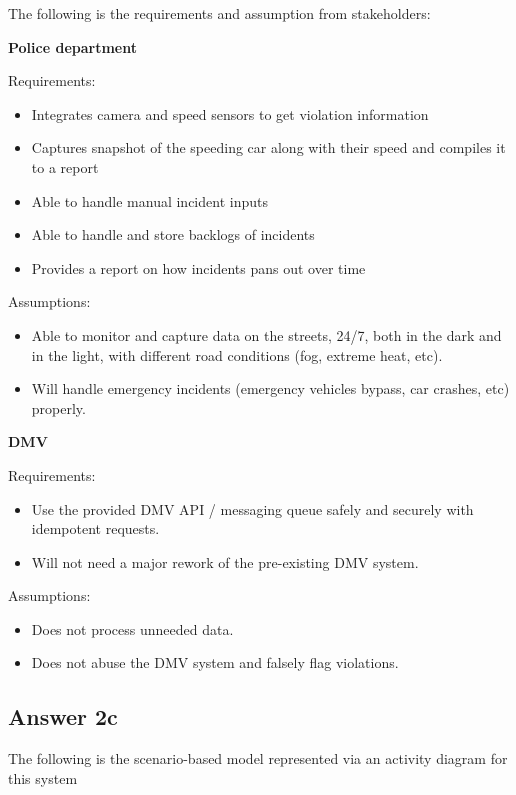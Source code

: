 \documentclass[
  11pt, %
]{assignment}
\begin{document}
The following is the requirements and assumption from stakeholders:

\textbf{Police department}

Requirements:
\begin{itemize}
  \item Integrates camera and speed sensors to get violation information
  \item Captures snapshot of the speeding car along with their speed and compiles it to a report
  \item Able to handle manual incident inputs
  \item Able to handle and store backlogs of incidents
  \item Provides a report on how incidents pans out over time
\end{itemize}

Assumptions:
\begin{itemize}
  \item Able to monitor and capture data on the streets, 24/7, both in the dark and in the light, with different road conditions (fog, extreme heat, etc).
  \item Will handle emergency incidents (emergency vehicles bypass, car crashes, etc) properly.
\end{itemize}

\bigskip

\textbf{DMV}

Requirements:
\begin{itemize}
  \item Use the provided DMV API / messaging queue safely and securely with idempotent requests.
  \item Will not need a major rework of the pre-existing DMV system.
\end{itemize}

Assumptions:
\begin{itemize}
  \item Does not process unneeded data.
  \item Does not abuse the DMV system and falsely flag violations.
\end{itemize}

\pagebreak

\subsection*{Answer 2c}

The following is the scenario-based model represented via an activity diagram for this system
\end{document}
